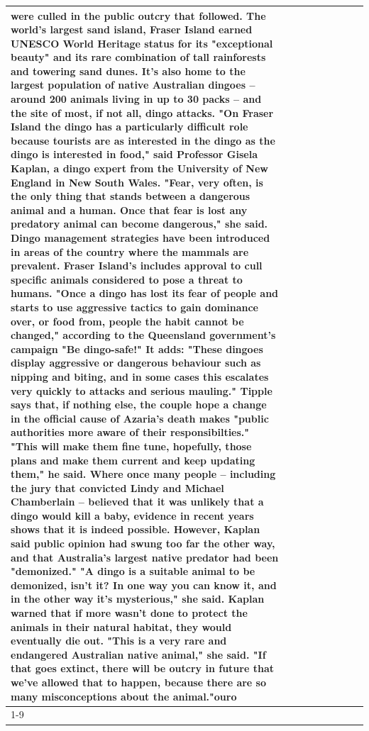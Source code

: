 \begin{table}[H]
\begin{tabular}{lllrlllll}
were culled in the public outcry that followed. The world's largest sand island, Fraser Island earned UNESCO World Heritage status for its "exceptional beauty" and its rare combination of tall rainforests and towering sand dunes. It's also home to the largest population of native Australian dingoes -- around 200 animals living in up to 30 packs -- and the site of most, if not all, dingo attacks. "On Fraser Island the dingo has a particularly difficult role because tourists are as interested in the dingo as the dingo is interested in food," said Professor Gisela Kaplan, a dingo expert from the University of New England in New South Wales. "Fear, very often, is the only thing that stands between a dangerous animal and a human. Once that fear is lost any predatory animal can become dangerous," she said. Dingo management strategies have been introduced in areas of the country where the mammals are prevalent. Fraser Island's includes approval to cull specific animals considered to pose a threat to humans. "Once a dingo has lost its fear of people and starts to use aggressive tactics to gain dominance over, or food from, people the habit cannot be changed," according to the Queensland government's campaign "Be dingo-safe!" It adds: "These dingoes display aggressive or dangerous behaviour such as nipping and biting, and in some cases this escalates very quickly to attacks and serious mauling." Tipple says that, if nothing else, the couple hope a change in the official cause of Azaria's death makes "public authorities more aware of their responsibilties." "This will make them fine tune, hopefully, those plans and make them current and keep updating them," he said. Where once many people -- including the jury that convicted Lindy and Michael Chamberlain -- believed that it was unlikely that a dingo would kill a baby, evidence in recent years shows that it is indeed possible. However, Kaplan said public opinion had swung too far the other way, and that Australia's largest native predator had been "demonized." "A dingo is a suitable animal to be demonized, isn't it? In one way you can know it, and in the other way it's mysterious," she said. Kaplan warned that if more wasn't done to protect the animals in their natural habitat, they would eventually die out. "This is a very rare and endangered Australian native animal," she said. "If that goes extinct, there will be outcry in future that we've allowed that to happen, because there are so many misconceptions about the animal."ouro \\
\cline{1-9}

\end{tabular}
\end{table}
